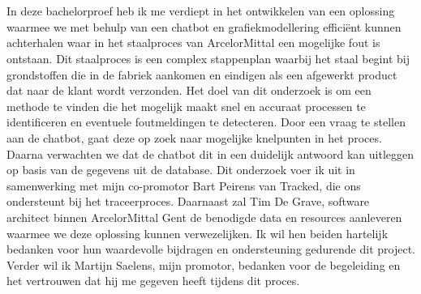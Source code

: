 
\chapter*{}%
\label{ch:voorwoord}

In deze bachelorproef heb ik me verdiept in het ontwikkelen van een oplossing waarmee we met behulp van een chatbot en grafiekmodellering efficiënt kunnen achterhalen waar in het staalproces van ArcelorMittal een mogelijke fout is ontstaan. 
Dit staalproces is een complex stappenplan waarbij het staal begint bij grondstoffen die in de fabriek aankomen en eindigen als een afgewerkt product dat naar de klant wordt verzonden.
Het doel van dit onderzoek is om een methode te vinden die het mogelijk maakt snel en accuraat processen te identificeren en eventuele foutmeldingen te detecteren.
Door een vraag te stellen aan de chatbot, gaat deze op zoek naar mogelijke knelpunten in het proces. Daarna verwachten we dat de chatbot dit in een duidelijk antwoord kan uitleggen op basis van de gegevens uit de database.
Dit onderzoek voer ik uit in samenwerking met mijn co-promotor Bart Peirens van Tracked, die ons ondersteunt bij het traceerproces. Daarnaast zal Tim De Grave, software architect binnen ArcelorMittal Gent de benodigde data en resources aanleveren waarmee we deze oplossing kunnen verwezelijken. 
Ik wil hen beiden hartelijk bedanken voor hun waardevolle bijdragen en ondersteuning gedurende dit project. Verder wil ik Martijn Saelens, mijn promotor, bedanken voor de begeleiding en het vertrouwen dat hij me gegeven heeft tijdens dit proces.
